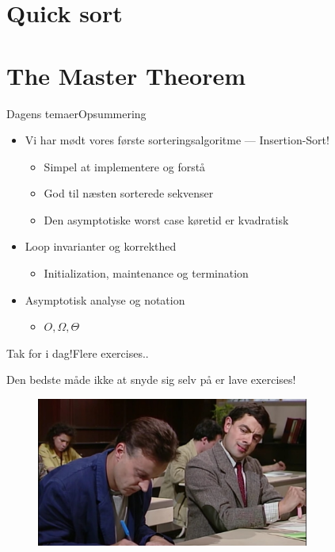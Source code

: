 \documentclass[aspectratio=1610]{beamer}
\begin{document}
\section{Quick sort}
\section{The Master Theorem}

\begin{frame}{Dagens temaer}{Opsummering}
    \begin{itemize}
        \item Vi har mødt vores første sorteringsalgoritme --- Insertion-Sort!
            \begin{itemize}
                \item Simpel at implementere og forstå
                \item God til næsten sorterede sekvenser
                \item Den asymptotiske worst case køretid er kvadratisk
            \end{itemize}
        \item Loop invarianter og korrekthed
            \begin{itemize}
                \item Initialization, maintenance og termination
            \end{itemize}
        \item Asymptotisk analyse og notation
            \begin{itemize}
                \item $O, \Omega, \Theta$
            \end{itemize}
    \end{itemize}
\end{frame}


\begin{frame}{Tak for i dag!}{Flere exercises..}

    Den bedste måde ikke at snyde sig selv på er lave exercises!

    \begin{figure}[h]
        \centering
        \includegraphics[width=0.8\textwidth]{exercises}
    \end{figure}
    
\end{frame}
\end{document}

